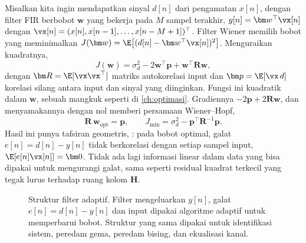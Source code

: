Misalkan kita ingin mendapatkan sinyal $d[n]$ dari pengamatan $x[n]$, dengan filter FIR berbobot
$\bm w$ yang bekerja pada $M$ sampel terakhir, $y[n]=\bm w^\top\vx[n]$ dengan
$\vx[n]=(x[n],x[n-1],\dots,x[n-M+1])^\top$. Filter Wiener memilih bobot yang meminimalkan
$J(\bm w)=\E\big[(d[n]-\bm w^\top\vx[n])^2\big]$. Menguraikan kuadratnya,
\begin{equation}
J(\bm w)=\sigma_d^2-2\bm w^\top\bm p+\bm w^\top\bm R\bm w,
\end{equation}
dengan $\bm R=\E[\vx\vx^\top]$ matriks autokorelasi input dan $\bm p=\E[\vx\,d]$ korelasi silang antara input
dan sinyal yang diinginkan. Fungsi ini kuadratik dalam $\bm w$, sebuah mangkuk seperti di
\cref{ch:optimasi}. Gradiennya $-2\bm p+2\bm R\bm w$, dan menyamakannya dengan nol memberi persamaan
Wiener--Hopf,
\begin{equation}
\bm R\,\bm w_{\mathrm{opt}}=\bm p,\qquad J_{\min}=\sigma_d^2-\bm p^\top\bm R^{-1}\bm p.
\end{equation}
Hasil ini punya tafsiran geometris, : pada bobot optimal, galat
$e[n]=d[n]-y[n]$ tidak berkorelasi dengan setiap sampel input, $\E[e[n]\vx[n]]=\bm0$. Tidak ada lagi
informasi linear dalam data yang bisa dipakai untuk mengurangi galat, sama seperti residual kuadrat
terkecil yang tegak lurus terhadap ruang kolom $\bm H$.

\begin{figure}[ht]
\centering
{}
\caption{Struktur filter adaptif. Filter mengeluarkan $y[n]$, galat $e[n]=d[n]-y[n]$ dan input dipakai
algoritme adaptif untuk memperbarui bobot. Struktur yang sama dipakai untuk identifikasi sistem,
peredam gema, peredam bising, dan ekualisasi kanal.}
\label{fig:adaptif}
\end{figure}

